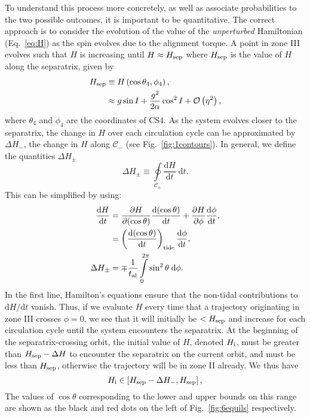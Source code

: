 \documentclass[
        fleqn,
        usenatbib,
    ]{mnras}
\newcommand*{\rd}[2]{\frac{\mathrm{d}#1}{\mathrm{d}#2}}
\newcommand*{\pd}[2]{\frac{\partial#1}{\partial#2}}
\newcommand*{\rdil}[2]{\mathrm{d}#1/\mathrm{d}#2}
\newcommand*{\p}[1]{\left(#1\right)}
\newcommand*{\s}[1]{\left[#1\right]}
\begin{document}
To understand this process more concretely, as well as associate probabilities
to the two possible outcomes, it is important to be quantitative. The correct
approach is to consider the evolution of the value of the \emph{unperturbed}
Hamiltonian (Eq.~\ref{eq:H}) as the spin evolves due to the alignment torque. A
point in zone III evolves such that $H$ is increasing until $H \approx H_{\rm
sep}$ where $H_{\rm sep}$ is the value of $H$ along the separatrix, given by
\begin{align}
    H_{\rm sep} &\equiv H\p{\cos \theta_{\rm 4}, \phi_{\rm 4}},\nonumber\\
        &\approx g\sin I + \frac{g^2}{2\alpha}\cos^2 I +
            \mathcal{O}\p{\eta^2},\label{eq:def_Hsep}
\end{align}
where $\theta_4$ and $\phi_4$ are the coordinates of CS4. As the system evolves
closer to the separatrix, the change in $H$ over each circulation cycle can be
approximated by $\Delta H_-$, the change in $H$ along $\mathcal{C}_-$ (see
Fig.~\ref{fig:1contours}). In general, we define the quantities $\Delta H_{\pm}$
\begin{equation}
    \Delta H_{\pm} \equiv \oint\limits_{\mathcal{C}_{\pm}}
        \rd{H}{t}\;\mathrm{d}t.\label{eq:def_dHpm}
\end{equation}
This can be simplified by using:
\begin{align}
    \rd{H}{t} &=
            \pd{H}{(\cos \theta)}\rd{(\cos \theta)}{t}
            + \pd{H}{\phi}\rd{\phi}{t},\nonumber\\
        &= \p{\rd{(\cos\theta)}{t}}_{\rm tide} \rd{\phi}{t},\\
    \Delta H_{\pm} &= \mp\frac{1}{t_{\rm al}}
        \int\limits_0^{2\pi} \sin^2\theta\;\mathrm{d}\phi.
\end{align}
In the first line, Hamilton's equations ensure that the non-tidal contributions
to $\rdil{H}{t}$ vanish. Thus, if we evaluate $H$ every time that a trajectory
originating in zone III crosses $\phi = 0$, we see that it will initially be $<
H_{\rm sep}$ and increase for each circulation cycle until the system encounters
the separatrix. At the beginning of the separatrix-crossing orbit, the initial
value of $H$, denoted $H_{\rm i}$, must be greater than $H_{\rm sep} - \Delta H$
to encounter the separatrix on the current orbit, and must be less than $H_{\rm
sep}$, otherwise the trajectory will be in zone II already. We thus have
\begin{equation}
    H_{\rm i} \in \s{ H_{\rm sep} - \Delta H_-,  H_{\rm sep} }
        \label{eq:Hi_range},
\end{equation}
The values of $\cos \theta$ corresponding to the lower and upper bounds on this
range are shown as the black and red dots on the left of Fig.~\ref{fig:6equils}
respectively.
\end{document}
